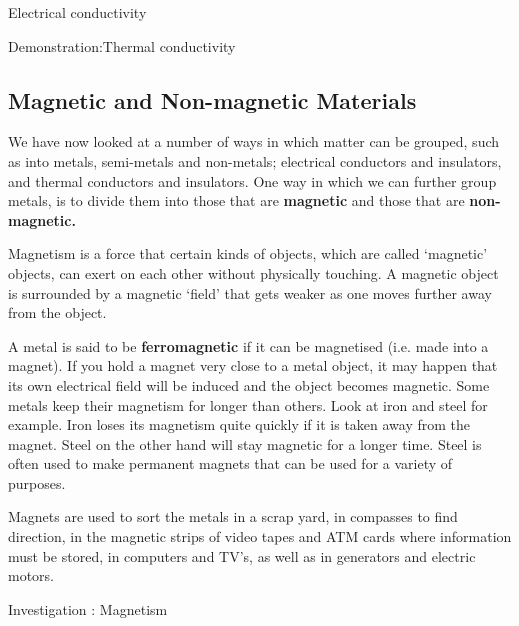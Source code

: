 \begin{iexperiment}{Electrical conductivity}
\begin{gexperiment}{Demonstration:Thermal conductivity}
            \subsection{ Magnetic and Non-magnetic Materials}
            \nopagebreak
      \label{m38706*id67151}We have now looked at a number of ways in which matter can be grouped, such as into metals, semi-metals and non-metals; electrical conductors and insulators, and thermal conductors and insulators. One way in which we can further group metals, is to divide them into those that are \textbf{magnetic} and those that are \textbf{non-magnetic.}\par 
\par
\Definition{   \label{id2410309} { Magnetism }} { \label{m38706*meaningfhsst!!!underscore!!!id570}
      \label{m38706*id67174}Magnetism is a force that certain kinds of objects, which are called `magnetic' objects, can exert on each other without physically touching. A magnetic object is surrounded by a magnetic `field' that gets weaker as one moves further away from the object. \par 
       } 
      \label{m38706*id67186}A metal is said to be \textbf{ferromagnetic} if it can be magnetised (i.e. made into a magnet). If you hold a magnet very close to a metal object, it may happen that its own electrical field will be induced and the object becomes magnetic. Some metals keep their magnetism for longer than others. Look at iron and steel for example. Iron loses its magnetism quite quickly if it is taken away from the magnet. Steel on the other hand will stay magnetic for a longer time. Steel is often used to make permanent magnets that can be used for a variety of purposes.\par 
      \label{m38706*id67200}Magnets are used to sort the metals in a scrap yard, in compasses to find direction, in the magnetic strips of video tapes and ATM cards where information must be stored, in computers and TV's, as well as in generators and electric motors.\par 
\label{m38706*secfhsst!!!underscore!!!id575}
            \begin{gexperiment}{Investigation : Magnetism}{
}
\end{gexperiment}
\end{gexperiment}
\end{iexperiment}
